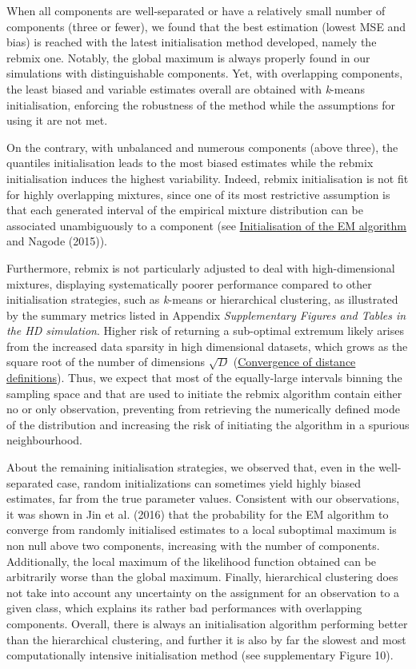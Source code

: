 When all components are well-separated or have a relatively small number of components (three or fewer), we found that the best
estimation (lowest MSE and bias) is reached with the latest initialisation method developed, namely the rebmix one. Notably, the global maximum is always properly found in our simulations with distinguishable components. Yet, with overlapping components, the least biased and variable estimates overall are obtained with \emph{k}-means initialisation, enforcing the robustness of the method while the assumptions for using it are not met.

On the contrary, with unbalanced and numerous components (above three), the quantiles initialisation leads to the most biased estimates while the rebmix initialisation induces the highest variability. Indeed, rebmix initialisation is not fit for highly overlapping mixtures, since one of its most restrictive assumption is that each generated interval of the empirical mixture distribution can be associated unambiguously to a component (see \protect\hyperlink{initialisation-of-the-em-algorithm}{Initialisation of the EM algorithm} and Nagode (2015)).

Furthermore, rebmix is not particularly adjusted to deal with high-dimensional mixtures, displaying systematically poorer performance compared to other initialisation strategies, such as \emph{k}-means or hierarchical clustering, as illustrated by the summary metrics listed in Appendix \emph{Supplementary Figures and Tables in the HD simulation}. Higher risk of returning a sub-optimal extremum likely arises from the increased data sparsity in high dimensional datasets, which grows as the square root of the number of dimensions \(\sqrt{D}\) (\href{https://en.wikipedia.org/wiki/Curse_of_dimensionality\#Distance_function}{Convergence of distance definitions}). Thus, we expect that most of the equally-large intervals binning the sampling space and that are used to initiate the rebmix algorithm contain either no or only observation, preventing from retrieving the numerically defined mode of the distribution and increasing the risk of initiating the algorithm in a spurious neighbourhood.

About the remaining initialisation strategies, we observed that, even in the well-separated case, random initializations can sometimes yield highly biased estimates, far from the true parameter values. Consistent with our observations, it was shown in Jin et al. (2016) that the probability for the EM algorithm to converge from randomly initialised estimates to a local suboptimal maximum is non null above two components, increasing with the number of components. Additionally, the local maximum of the likelihood function obtained can be arbitrarily worse than the global maximum. Finally, hierarchical clustering does not take into account any uncertainty on the assignment for an observation to a given class, which explains its rather bad performances with overlapping components. Overall, there is always an initialisation algorithm performing better than the hierarchical clustering, and further it is also by far the slowest and most computationally intensive initialisation method (see supplementary Figure 10).

